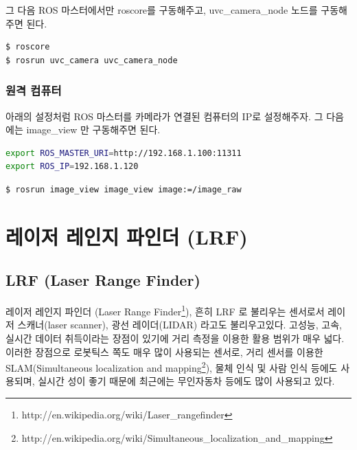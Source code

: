 \noindent
그 다음 ROS 마스터에서만 roscore를 구동해주고, uvc\_camera\_node 노드를 구동해 주면 된다.

\begin{lstlisting}[language=ROS]
$ roscore
$ rosrun uvc_camera uvc_camera_node
\end{lstlisting}

\subsubsection{원격 컴퓨터}

아래의 설정처럼 ROS 마스터를 카메라가 연결된 컴퓨터의 IP로 설정해주자. 그 다음에는 image\_view 만 구동해주면 된다.

\begin{lstlisting}[language=bash]
export ROS_MASTER_URI=http://192.168.1.100:11311 
export ROS_IP=192.168.1.120
\end{lstlisting}

\begin{lstlisting}[language=ROS]
$ rosrun image_view image_view image:=/image_raw
\end{lstlisting}

\section{레이저 레인지 파인더 (LRF)}

\subsection{LRF (Laser Range Finder)}

레이저 레인지 파인더 (Laser Range Finder\footnote{http://en.wikipedia.org/wiki/Laser\_rangefinder}), 흔히 LRF 로 불리우는 센서로서 레이저 스캐너(laser scanner), 광선 레이더(LIDAR) 라고도 불리우고있다. 고성능, 고속, 실시간 데이터 취득이라는 장점이 있기에 거리 측정을 이용한 활용 범위가 매우 넓다. 이러한 장점으로 로봇틱스 쪽도 매우 많이 사용되는 센서로, 거리 센서를 이용한 SLAM(Simultaneous localization and mapping\footnote{http://en.wikipedia.org/wiki/Simultaneous\_localization\_and\_mapping}), 물체 인식 및 사람 인식 등에도 사용되며, 실시간 성이 좋기 때문에 최근에는 무인자동차 등에도 많이 사용되고 있다. 

